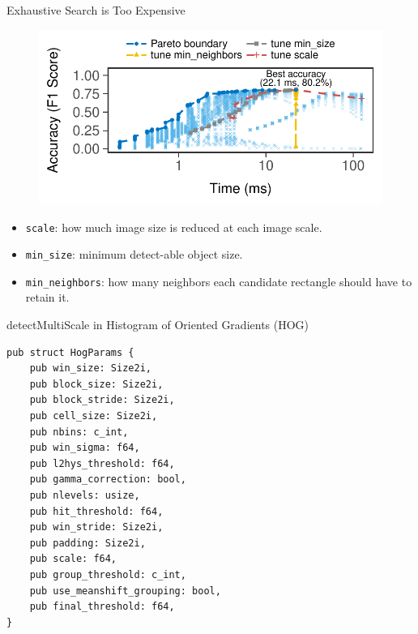 \begin{frame}{Exhaustive Search is Too Expensive}
  \vspace{1em}
  \begin{figure}
    \centering
    \includegraphics[width=0.8\linewidth]{figures/serving-eval-exhaustive.pdf}
  \end{figure}

  \begin{itemize}
  \item \texttt{scale}: how much image size is reduced at each image scale.
  \item \texttt{min\_size}: minimum detect-able object size.
  \item \texttt{min\_neighbors}: how many neighbors each candidate rectangle
    should have to retain it.
  \end{itemize}
\end{frame}

\begin{frame}[fragile]{detectMultiScale in Histogram of Oriented Gradients (HOG)}
  \vspace{1em}
  \centering
\begin{Verbatim}[fontsize=\scriptsize]
pub struct HogParams {
    pub win_size: Size2i,
    pub block_size: Size2i,
    pub block_stride: Size2i,
    pub cell_size: Size2i,
    pub nbins: c_int,
    pub win_sigma: f64,
    pub l2hys_threshold: f64,
    pub gamma_correction: bool,
    pub nlevels: usize,
    pub hit_threshold: f64,
    pub win_stride: Size2i,
    pub padding: Size2i,
    pub scale: f64,
    pub group_threshold: c_int,
    pub use_meanshift_grouping: bool,
    pub final_threshold: f64,
}
\end{Verbatim}
\end{frame}

